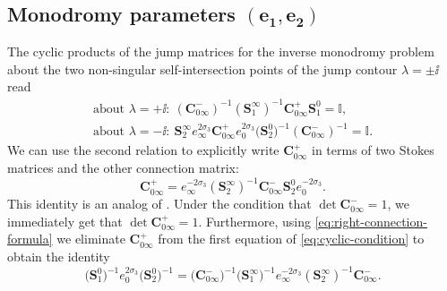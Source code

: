 \subsection[Monodromy parameters (e\_1, e\_2)]{Monodromy parameters $\boldsymbol{(e_1, e_2)}$}\label{subsec:cyclic}
The cyclic products of the jump matrices for the inverse monodromy problem about the two non-singular self-intersection points of the jump contour $\lambda=\pm\ii$ read
 \begin{gather}
 \text{about } \lambda=+\ii \colon\ (\mathbf{C}_{0\infty}^-)^{-1}(\mathbf{S}^\infty_{1})^{-1}\mathbf{C}_{0\infty}^+\mathbf{S}^0_{1}=\mathbb{I},\nonumber\\
 \text{about } \lambda=-\ii\colon\
 \mathbf{S}_{2}^\infty e_\infty^{2\sigma_3}\mathbf{C}_{0\infty}^+e_0^{2\sigma_3}\big(\mathbf{S}^0_{2}\big)^{-1}(\mathbf{C}_{0\infty}^-)^{-1}=\mathbb{I}.
 \label{eq:cyclic-condition}
 \end{gather}
 We can use the second relation to explicitly write $\mathbf{C}_{0\infty}^+$ in terms of two Stokes matrices and the other connection matrix:
 \begin{equation} \mathbf{C}_{0\infty}^+=e_\infty^{-2\sigma_3}(\mathbf{S}_{2}^\infty )^{-1}\mathbf{C}_{0\infty}^-\mathbf{S}^0_{2}e_0^{-2\sigma_3}.
 \label{eq:right-connection-formula}
 \end{equation}
This identity is an analog of \cite[equation~(3.17)]{Jimbo}.
 Under the condition that $\det \mathbf{C}_{0\infty}^- = 1$, we immediately get that $\det \mathbf{C}_{0\infty}^+ = 1$. Furthermore, using \eqref{eq:right-connection-formula} we eliminate $\mathbf{C}_{0\infty}^+$ from the first equation of \eqref{eq:cyclic-condition} to obtain the identity
 \begin{equation}
 \big(\mathbf{S}^0_{1}\big)^{-1}e_0^{2\sigma_3}\big(\mathbf{S}_{2}^0 \big)^{-1} = \big(\mathbf{C}_{0\infty}^-\big)^{-1}\big(\mathbf{S}^\infty_{1}\big)^{-1}e_\infty^{-2\sigma_3}(\mathbf{S}_{2}^\infty )^{-1}\mathbf{C}_{0\infty}^-.
 \label{eq:left-connection-identity}
 \end{equation}

